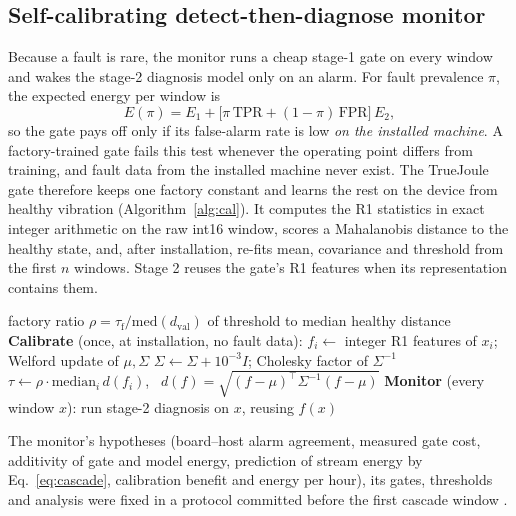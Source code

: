 \documentclass[conference]{IEEEtran}
\newcommand{\TJ}{TrueJoule}
\begin{document}
\subsection{Self-calibrating detect-then-diagnose monitor}\label{sec:tj-mon}
Because a fault is rare, the monitor runs a cheap stage-1 gate on every window and wakes the stage-2 diagnosis model
only on an alarm. For fault prevalence $\pi$, the expected energy per window is
\begin{equation}
E(\pi)=E_1+\big[\pi\,\mathrm{TPR}+(1-\pi)\,\mathrm{FPR}\big]\,E_2 ,
\label{eq:cascade}
\end{equation}
so the gate pays off only if its false-alarm rate is low \emph{on the installed machine}. A factory-trained gate
fails this test whenever the operating point differs from training, and fault data from the installed machine never
exist. The \TJ{} gate therefore keeps one factory constant and learns the rest on the device from healthy vibration
(Algorithm~\ref{alg:cal}). It computes the R1 statistics in exact integer arithmetic on the raw int16 window, scores a
Mahalanobis distance to the healthy state, and, after installation, re-fits mean, covariance and threshold from the
first $n$ windows. Stage 2 reuses the gate's R1 features when its representation contains them.

\begin{algorithm}[t]
\caption{On-device calibration and monitoring}\label{alg:cal}
\begin{algorithmic}[1]
\Require factory ratio $\rho=\tau_\mathrm{f}/\mathrm{med}(d_\mathrm{val})$ of threshold to median healthy distance
\State \textbf{Calibrate} (once, at installation, no fault data):
  \State $f_i\gets$ integer R1 features of $x_i$; Welford update of $\mu,\Sigma$
\EndFor
\State $\Sigma\gets\Sigma+10^{-3}I$; Cholesky factor of $\Sigma^{-1}$
\State $\tau\gets\rho\cdot\mathrm{median}_i\, d(f_i)$, \ $d(f)=\sqrt{(f-\mu)^\top\Sigma^{-1}(f-\mu)}$
\State \textbf{Monitor} (every window $x$):
 run stage-2 diagnosis on $x$, reusing $f(x)$ \EndIf
\end{algorithmic}
\end{algorithm}

The monitor's hypotheses (board--host alarm agreement, measured gate cost, additivity of gate and model energy,
prediction of stream energy by Eq.~\eqref{eq:cascade}, calibration benefit and energy per hour), its gates, thresholds
and analysis were fixed in a protocol committed before the first cascade window \cite{nosek2018preregistration}.
\end{document}
